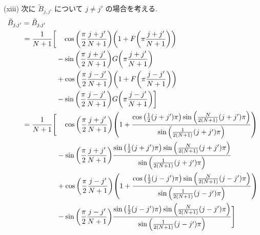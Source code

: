 \documentclass[uplatex,dvipdfmx,a4paper,11pt]{jlreq}
\theoremstyle{definition}
\begin{document}
(xiii) 次に $\tilde{B}_{j,j'}$ について $j \neq j'$ の場合を考える.
\begin{align}
  \tilde{B}_{j,j'} & = \tilde{B}_{j,j'}                                                                                                                                                                         \\
                   & \ \begin{aligned}
                         = \frac{1}{N+1}\bigg[ & \quad\cos\qty(\frac{\pi}{2}\frac{j + j'}{N+1})\qty(1 + F\qty(\pi\frac{j + j'}{N+1})) \\
                                               & - \sin\qty(\frac{\pi}{2}\frac{j + j'}{N+1})G\qty(\pi\frac{j + j'}{N+1})              \\
                                               & + \cos\qty(\frac{\pi}{2}\frac{j - j'}{N+1})\qty(1 + F\qty(\pi\frac{j - j'}{N+1}))    \\
                                               & - \sin\qty(\frac{\pi}{2}\frac{j - j'}{N+1})G\qty(\pi\frac{j - j'}{N+1})\bigg]
                       \end{aligned}                                                                                               \\
                   & \ \begin{aligned}
                         = \frac{1}{N+1}\Bigg[ & \quad\cos\qty(\frac{\pi}{2}\frac{j + j'}{N+1})\qty(1 + \frac{\cos\qty(\frac{1}{2}(j+j')\pi)\sin\qty(\frac{N}{2(N+1)}(j+j')\pi)}{\sin\qty(\frac{1}{2(N+1)}(j+j')\pi)}) \\
                                               & - \sin\qty(\frac{\pi}{2}\frac{j + j'}{N+1})\frac{\sin\qty(\frac{1}{2}(j+j')\pi)\sin\qty(\frac{N}{2(N+1)}(j+j')\pi)}{\sin\qty(\frac{1}{2(N+1)}(j+j')\pi)}              \\
                                               & + \cos\qty(\frac{\pi}{2}\frac{j - j'}{N+1})\qty(1 + \frac{\cos\qty(\frac{1}{2}(j-j')\pi)\sin\qty(\frac{N}{2(N+1)}(j-j')\pi)}{\sin\qty(\frac{1}{2(N+1)}(j-j')\pi)})    \\
                                               & - \sin\qty(\frac{\pi}{2}\frac{j - j'}{N+1})\frac{\sin\qty(\frac{1}{2}(j-j')\pi)\sin\qty(\frac{N}{2(N+1)}(j-j')\pi)}{\sin\qty(\frac{1}{2(N+1)}(j-j')\pi)}\Bigg]
                       \end{aligned}                                                                                                \\

\end{align}
\end{document}
